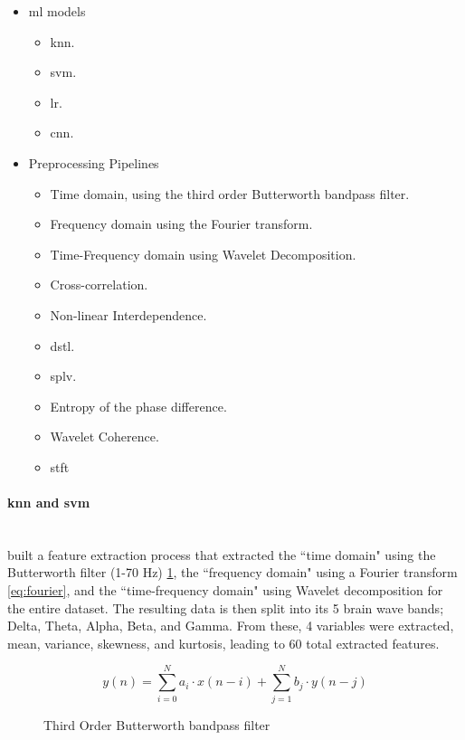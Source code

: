 \documentclass[12pt]{article}
\begin{document}
\begin{itemize}
	\item \acrfull{ml} models
	\begin{itemize}
	\item \acrfull{knn}.
	\item \acrfull{svm}.
	\item \acrfull{lr}.
	\item \acrfull{cnn}.
	\end{itemize}
	\item Preprocessing Pipelines
	\begin{itemize}
	\item Time domain, using the third order Butterworth bandpass filter.
	\item Frequency domain using the Fourier transform.
	\item Time-Frequency domain using Wavelet Decomposition.
	\item Cross-correlation.
	\item Non-linear Interdependence.
	\item \acrfull{dstl}.
	\item \acrfull{splv}.
	\item Entropy of the phase difference.
	\item Wavelet Coherence.
	\item \acrfull{stft}
	\end{itemize}
\end{itemize}

\paragraph{\acrfull{knn} and \acrfull{svm}}\mbox{}\\

\cite{savadkoohi2020machine} built a feature extraction process that extracted the ``time domain" using the Butterworth filter (1-70 Hz) \ref{eq:butterworth}, the ``frequency domain" using a Fourier transform  \ref{eq:fourier}, and the ``time-frequency domain" using Wavelet decomposition for the entire dataset. The resulting data is then split into its 5 brain wave bands; Delta, Theta, Alpha, Beta, and Gamma. From these, 4 variables were extracted, mean, variance, skewness, and kurtosis, leading to 60 total extracted features. 

\begin{figure}[H]
\[ y(n) = \sum_{i=0}^{N} a_i \cdot x(n - i) + \sum_{j=1}^{N} b_j \cdot y(n - j) \]
\caption{Third Order Butterworth bandpass filter}
\label{eq:butterworth}
\end{figure}
\end{document}
